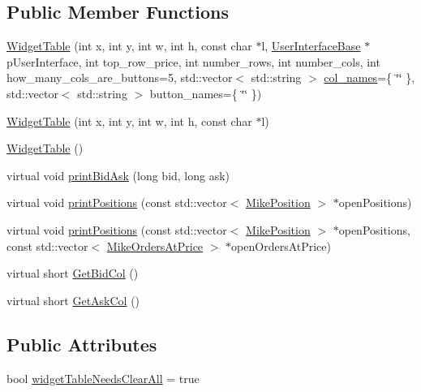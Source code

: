 \subsection*{Public Member Functions}
\begin{DoxyCompactItemize}
\item 
\hyperlink{class_mike_1_1_widget_table_a2b409a5c6b7f2f4fd589ac0250fc297d}{Widget\+Table} (int x, int y, int w, int h, const char $\ast$l, \hyperlink{class_mike_1_1_user_interface_base}{User\+Interface\+Base} $\ast$p\+User\+Interface, int top\+\_\+row\+\_\+price, int number\+\_\+rows, int number\+\_\+cols, int how\+\_\+many\+\_\+cols\+\_\+are\+\_\+buttons=5, std\+::vector$<$ std\+::string $>$ \hyperlink{class_mike_1_1_wid_table_base_acc76591b1fa97f8259fc95f492d8e1b9}{col\+\_\+names}=\{ \char`\"{}\char`\"{} \}, std\+::vector$<$ std\+::string $>$ button\+\_\+names=\{ \char`\"{}\char`\"{} \})
\item 
\hyperlink{class_mike_1_1_widget_table_a1989e5265f9e1d53512d5936d21d41b5}{Widget\+Table} (int x, int y, int w, int h, const char $\ast$l)
\item 
\hyperlink{class_mike_1_1_widget_table_a141dd523d530477be58523c3ae2c2365}{Widget\+Table} ()
\item 
virtual void \hyperlink{class_mike_1_1_widget_table_a4a798ce9e43334f3ee1823c89ee91cf3}{print\+Bid\+Ask} (long bid, long ask)
\item 
virtual void \hyperlink{class_mike_1_1_widget_table_a8e269ede4b6a6ca1ef70ef588aa5e601}{print\+Positions} (const std\+::vector$<$ \hyperlink{class_mike_1_1_mike_position}{Mike\+Position} $>$ $\ast$open\+Positions)
\item 
virtual void \hyperlink{class_mike_1_1_widget_table_a4ed53614a2ef8bc68994a84af4b30084}{print\+Positions} (const std\+::vector$<$ \hyperlink{class_mike_1_1_mike_position}{Mike\+Position} $>$ $\ast$open\+Positions, const std\+::vector$<$ \hyperlink{class_mike_1_1_mike_orders_at_price}{Mike\+Orders\+At\+Price} $>$ $\ast$open\+Orders\+At\+Price)
\item 
virtual short \hyperlink{class_mike_1_1_widget_table_a72cefeed8a17eb9abea21c3f38d7fe23}{Get\+Bid\+Col} ()
\item 
virtual short \hyperlink{class_mike_1_1_widget_table_a7f23d041f5d4eab8103cca41951f7863}{Get\+Ask\+Col} ()
\end{DoxyCompactItemize}
\subsection*{Public Attributes}
\begin{DoxyCompactItemize}
\item 
bool \hyperlink{class_mike_1_1_widget_table_a4036058693902d510469a59b9466a366}{widget\+Table\+Needs\+Clear\+All} = true
\end{DoxyCompactItemize}
